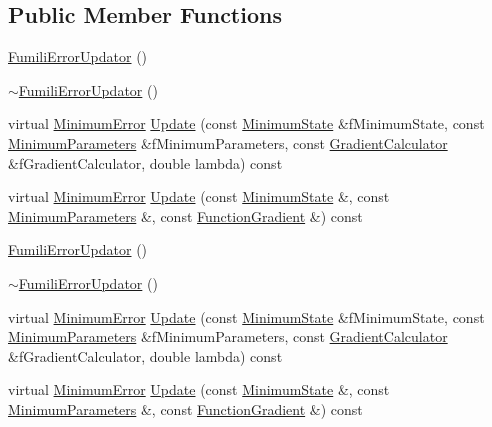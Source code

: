 \subsection*{Public Member Functions}
\begin{DoxyCompactItemize}
\item 
\mbox{\hyperlink{classROOT_1_1Minuit2_1_1FumiliErrorUpdator_a6f6a3c5b10d58710f4d26b431e89907b}{Fumili\+Error\+Updator}} ()
\item 
\mbox{\hyperlink{classROOT_1_1Minuit2_1_1FumiliErrorUpdator_a601351a2ef04f881819b0115f88696e5}{$\sim$\+Fumili\+Error\+Updator}} ()
\item 
virtual \mbox{\hyperlink{classROOT_1_1Minuit2_1_1MinimumError}{Minimum\+Error}} \mbox{\hyperlink{classROOT_1_1Minuit2_1_1FumiliErrorUpdator_a56adeed7f507548e61a3563182f3caaf}{Update}} (const \mbox{\hyperlink{classROOT_1_1Minuit2_1_1MinimumState}{Minimum\+State}} \&f\+Minimum\+State, const \mbox{\hyperlink{classROOT_1_1Minuit2_1_1MinimumParameters}{Minimum\+Parameters}} \&f\+Minimum\+Parameters, const \mbox{\hyperlink{classROOT_1_1Minuit2_1_1GradientCalculator}{Gradient\+Calculator}} \&f\+Gradient\+Calculator, double lambda) const
\item 
virtual \mbox{\hyperlink{classROOT_1_1Minuit2_1_1MinimumError}{Minimum\+Error}} \mbox{\hyperlink{classROOT_1_1Minuit2_1_1FumiliErrorUpdator_ae5ee7f2052c474169dd19ffbc3755bd3}{Update}} (const \mbox{\hyperlink{classROOT_1_1Minuit2_1_1MinimumState}{Minimum\+State}} \&, const \mbox{\hyperlink{classROOT_1_1Minuit2_1_1MinimumParameters}{Minimum\+Parameters}} \&, const \mbox{\hyperlink{classROOT_1_1Minuit2_1_1FunctionGradient}{Function\+Gradient}} \&) const
\item 
\mbox{\hyperlink{classROOT_1_1Minuit2_1_1FumiliErrorUpdator_a6f6a3c5b10d58710f4d26b431e89907b}{Fumili\+Error\+Updator}} ()
\item 
\mbox{\hyperlink{classROOT_1_1Minuit2_1_1FumiliErrorUpdator_a601351a2ef04f881819b0115f88696e5}{$\sim$\+Fumili\+Error\+Updator}} ()
\item 
virtual \mbox{\hyperlink{classROOT_1_1Minuit2_1_1MinimumError}{Minimum\+Error}} \mbox{\hyperlink{classROOT_1_1Minuit2_1_1FumiliErrorUpdator_a8aea4f3c69cee306853aee2b9f302b76}{Update}} (const \mbox{\hyperlink{classROOT_1_1Minuit2_1_1MinimumState}{Minimum\+State}} \&f\+Minimum\+State, const \mbox{\hyperlink{classROOT_1_1Minuit2_1_1MinimumParameters}{Minimum\+Parameters}} \&f\+Minimum\+Parameters, const \mbox{\hyperlink{classROOT_1_1Minuit2_1_1GradientCalculator}{Gradient\+Calculator}} \&f\+Gradient\+Calculator, double lambda) const
\item 
virtual \mbox{\hyperlink{classROOT_1_1Minuit2_1_1MinimumError}{Minimum\+Error}} \mbox{\hyperlink{classROOT_1_1Minuit2_1_1FumiliErrorUpdator_a7a634a18816d8cdc6db8d92b27b69095}{Update}} (const \mbox{\hyperlink{classROOT_1_1Minuit2_1_1MinimumState}{Minimum\+State}} \&, const \mbox{\hyperlink{classROOT_1_1Minuit2_1_1MinimumParameters}{Minimum\+Parameters}} \&, const \mbox{\hyperlink{classROOT_1_1Minuit2_1_1FunctionGradient}{Function\+Gradient}} \&) const
\end{DoxyCompactItemize}


